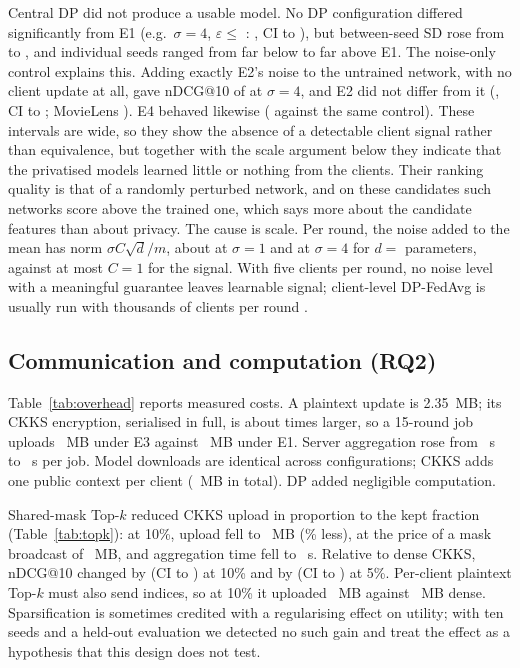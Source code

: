 \documentclass[11pt,a4paper]{article}
\begin{document}
Central DP did not produce a usable model. No DP configuration differed significantly from E1 (e.g.\ $\sigma=4$, $\varepsilon\leq$ : , CI  to ), but between-seed SD rose from  to , and individual seeds ranged from far below to far above E1. The noise-only control explains this. Adding exactly E2's noise to the untrained network, with no client update at all, gave nDCG@10 of  at $\sigma=4$, and E2 did not differ from it (, CI  to ; MovieLens ). E4 behaved likewise ( against the same control). These intervals are wide, so they show the absence of a detectable client signal rather than equivalence, but together with the scale argument below they indicate that the privatised models learned little or nothing from the clients. Their ranking quality is that of a randomly perturbed network, and on these candidates such networks score above the trained one, which says more about the candidate features than about privacy. The cause is scale. Per round, the noise added to the mean has norm $\sigma C\sqrt{d}/m$, about  at $\sigma=1$ and  at $\sigma=4$ for $d=$  parameters, against at most $C=1$ for the signal. With five clients per round, no noise level with a meaningful guarantee leaves learnable signal; client-level DP-FedAvg is usually run with thousands of clients per round \cite{mcmahan2018learning}.



\subsection{Communication and computation (RQ2)}

Table~\ref{tab:overhead} reports measured costs. A plaintext update is 2.35~MB; its CKKS encryption, serialised in full, is about  times larger, so a 15-round job uploads ~MB under E3 against ~MB under E1. Server aggregation rose from ~s to ~s per job. Model downloads are identical across configurations; CKKS adds one public context per client (~MB in total). DP added negligible computation.



Shared-mask Top-$k$ reduced CKKS upload in proportion to the kept fraction (Table~\ref{tab:topk}): at 10\%, upload fell to ~MB (\% less), at the price of a mask broadcast of ~MB, and aggregation time fell to ~s. Relative to dense CKKS, nDCG@10 changed by  (CI  to ) at 10\% and by  (CI  to ) at 5\%. Per-client plaintext Top-$k$ must also send indices, so at 10\% it uploaded ~MB against ~MB dense. Sparsification is sometimes credited with a regularising effect on utility; with ten seeds and a held-out evaluation we detected no such gain and treat the effect as a hypothesis that this design does not test.
\end{document}
